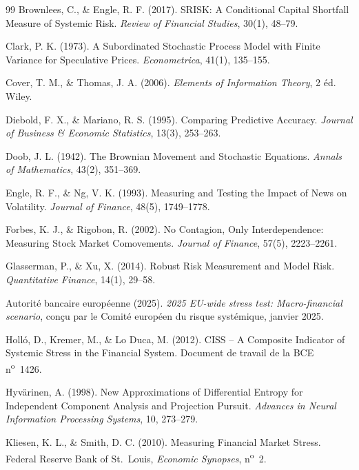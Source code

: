 \documentclass[11pt]{article}
\theoremstyle{definition}
\begin{document}
\begin{thebibliography}{99}
 Brownlees, C., \& Engle, R. F. (2017). SRISK: A Conditional Capital Shortfall Measure of Systemic Risk. \textit{Review of Financial Studies}, 30(1), 48--79.

 Clark, P. K. (1973). A Subordinated Stochastic Process Model with Finite Variance for Speculative Prices. \textit{Econometrica}, 41(1), 135--155.

 Cover, T. M., \& Thomas, J. A. (2006). \textit{Elements of Information Theory}, 2\ieme{} éd. Wiley.

 Diebold, F. X., \& Mariano, R. S. (1995). Comparing Predictive Accuracy. \textit{Journal of Business \& Economic Statistics}, 13(3), 253--263.

 Doob, J. L. (1942). The Brownian Movement and Stochastic Equations. \textit{Annals of Mathematics}, 43(2), 351--369.

 Engle, R. F., \& Ng, V. K. (1993). Measuring and Testing the Impact of News on Volatility. \textit{Journal of Finance}, 48(5), 1749--1778.

 Forbes, K. J., \& Rigobon, R. (2002). No Contagion, Only Interdependence: Measuring Stock Market Comovements. \textit{Journal of Finance}, 57(5), 2223--2261.

 Glasserman, P., \& Xu, X. (2014). Robust Risk Measurement and Model Risk. \textit{Quantitative Finance}, 14(1), 29--58.

 Autorité bancaire européenne (2025). \textit{2025 EU-wide stress test: Macro-financial scenario}, conçu par le Comité européen du risque systémique, janvier 2025.

 Holló, D., Kremer, M., \& Lo Duca, M. (2012). CISS -- A Composite Indicator of Systemic Stress in the Financial System. Document de travail de la BCE n\textsuperscript{o}~1426.

 Hyvärinen, A. (1998). New Approximations of Differential Entropy for Independent Component Analysis and Projection Pursuit. \textit{Advances in Neural Information Processing Systems}, 10, 273--279.

 Kliesen, K. L., \& Smith, D. C. (2010). Measuring Financial Market Stress. Federal Reserve Bank of St.~Louis, \textit{Economic Synopses}, n\textsuperscript{o}~2.


\end{thebibliography}
\end{document}
